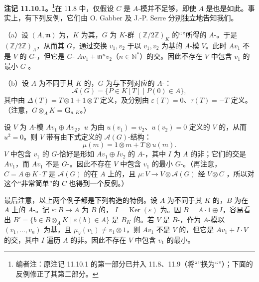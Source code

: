 \textbf{注记 11.10.1。}\footnote{编者注：原注记 11.10.1 的第一部分已并入 11.8、11.9（将“”换为“”）；下面的反例修正了其第二部分。}在 11.8 中，仅假设 $C$ 是 $A$-模并不足够，即使 $A$ 是也是如此。事实上，有下列反例，它们由 O. Gabber 及 J.-P. Serre 分别独立地告知我们。

（a）设 $(A,\mathfrak m)$ 为，$K$ 为其，$G$ 为 $K$-群 $(\mathbb Z/2\mathbb Z)_K$ 的“”所得的 $A$-。于是 $(\mathbb Z/2\mathbb Z)_A$，从而其 $G$，通过交换 $v_1,v_2$ 于以 $v_1,v_2$ 为基的 $A$-模 $V$。此时 $Av_1$ 不是 $V$ 的 $G$-，但它是 $G$- $Av_1+\mathfrak m^n v_2$（$n\in\mathbb N^*$）的交。因此不存在 $V$ 中包含 $v_1$ 的最小 $G$-。

（b）设 $A$ 为不同于其 $K$ 的，$G$ 为与下列对应的 $A$-：
\[
\mathcal A(G)=\{P\in K[T]\mid P(0)\in A\},
\]
其中由 $\Delta(T)=T\otimes1+1\otimes T$ 定义，及分别由 $\varepsilon(T)=0$、$\tau(T)=-T$ 定义。（注意，$G\otimes_A K=\mathbf G_{a,K}$。）

设 $V$ 为 $A$-模 $Av_1\oplus Av_2$，$u$ 为由 $u(v_1)=v_2$、$u(v_2)=0$ 定义的 $V$ 的，从而 $u^2=0$。则 $V$ 带有由下式定义的 $\mathcal A(G)$-结构：
\[
\mu(m)=1\otimes m+T\otimes u(m).
\]
$V$ 中包含 $v_1$ 的 $G$-恰好是形如 $Av_1\oplus Iv_2$ 的 $A$-，其中 $I$ 为 $A$ 的非；它们的交是 $Av_1$，而 $Av_1$ 不是 $G$-。因此不存在 $V$ 中包含 $v_1$ 的最小 $G$-。（再注意，$C=A\oplus K\cdot T$ 是 $\mathcal A(G)$ 的在 $A$ 上的，且 $\mu:V\to V\otimes\mathcal A(G)$ 经 $V\otimes C$ ，所以对这个“非常简单”的 $C$ 也得到一个反例。）

最后注意，以上两个例子都是下列构造的特例。设 $A$ 为不同于其 $K$ 的，$B$ 为在 $A$ 上的 $A$-。记 $\varepsilon:B\to A$ 为 $B$ 的，
$I=\operatorname{Ker}(\varepsilon)$ 为。因 $B=A\cdot1\oplus I$，容易看出 $B'=\{b\in B\otimes_A K\mid\varepsilon(b)\in A\}$ 是 $B_K$ 的。若 $V$ 是 $B$-，作为 $A$-模以 $(v_1,\ldots,v_n)$ 为基，且 $\mu_V(v_1)\ne v_1\otimes1$，则 $Av_1$ 不是 $V$ 的，但它是 $Av_1+I\cdot V$ 的交，其中 $I$ 遍历 $A$ 的非。因此不存在 $V$ 中包含 $v_1$ 的最小。

